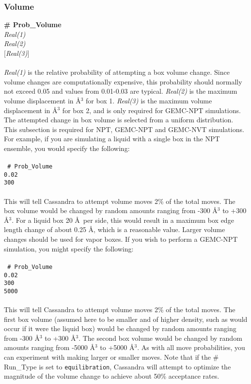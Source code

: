 \subsubsection{Volume}
{\bf \# Prob\_Volume} \\
{\it Real(1)} \\
{\it Real(2)} \\
{[}{\it Real(3)}] \\ \\
%
{\it Real(1)} is the relative probability of attempting a box volume change.
Since volume changes are computationally expensive, this probability should
normally not exceed 0.05 and values from 0.01-0.03 are typical.
{\it Real(2)} is the maximum volume displacement in \AA$^3$ for box 1.
{\it Real(3)} is the maximum volume displacement in \AA$^3$ for box 2,
and is only required for GEMC-NPT simulations.
The attempted change in box volume is selected from a uniform distribution.
This subsection is required for NPT, GEMC-NPT and GEMC-NVT simulations.
%
For example, if you are simulating a liquid with a single box in the NPT ensemble,
you would specify the following: \\ \\
%
\texttt{
\# Prob\_Volume \\
0.02 \\
300} \\ \\
%
This will tell Cassandra to attempt volume moves 2\% of the
total moves. The box volume would be changed by random amounts ranging from
-300 \AA$^3$ to +300 \AA$^3$. For a liquid box 20 \AA\ per side,
this would result in a maximum box edge length change of about 0.25
\AA, which is a reasonable value.
Larger volume changes should be used for vapor boxes.
%
If you wish to perform a GEMC-NPT simulation, you might specify the
following: \\ \\
%
\texttt{
\# Prob\_Volume \\
0.02 \\
300 \\
5000} \\ \\
%
This will tell Cassandra to attempt volume moves 2\% of the
total moves. The first box volume (assumed here to be smaller and of higher
density, such as would occur if it were the liquid box) would be
changed by random amounts ranging from
-300 \AA $^3$ to +300 \AA $^3$. The second box volume would be
changed by random amounts ranging from
-5000 \AA $^3$ to +5000 \AA $^3$. As with all move probabilities, you
can experiment with making
larger or smaller moves. Note that if the \# Run\_Type is set
to {\tt equilibration}, Cassandra will attempt to optimize the magnitude of
the volume change to achieve about 50\% acceptance rates.

